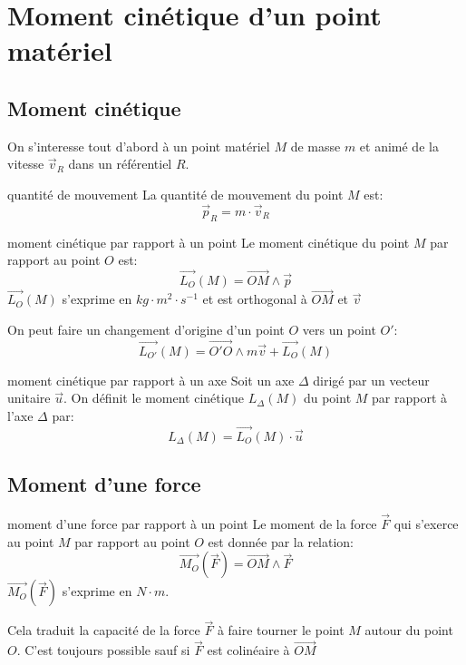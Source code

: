 \section{Moment cinétique d'un point matériel}
\subsection{Moment cinétique}

On s'interesse tout d'abord à un point matériel $M$ de masse $m$ 
et animé de la vitesse $\vec{v}_{R}$ dans un référentiel $R$. 
\newline
\begin{definition}{quantité de mouvement}{}
    La quantité de mouvement du point $M$ est: \[\vec{p}_{R} = m \cdot \vec{v}_{R}\]
\end{definition}

\begin{definition}{moment cinétique par rapport à un point}{}
    Le moment cinétique du point $M$ par rapport au point $O$ est:
    \[\vec{L_{O}}(M) = \vec{OM} \wedge \vec{p}\]
    $\vec{L_{O}}(M)$ s'exprime en $kg \cdot m^{2} \cdot s^{-1}$ 
    et est orthogonal à $\vec{OM}$ et $\vec{v}$
\end{definition}

\begin{remark}{}{}
    On peut faire un changement d'origine d'un point $O$ vers un point $O'$:
    \[\vec{L_{O'}}(M) = \vec{O'O} \wedge m\vec{v} + \vec{L_{O}}(M)\]
\end{remark}

\begin{definition}{moment cinétique par rapport à un axe}{}
    Soit un axe $\Delta$ dirigé par un vecteur unitaire $\vec{u}$.
    \newline
    On définit le moment cinétique $L_{\Delta}(M)$ du point $M$ par rapport à l'axe
    $\Delta$ par:
    \[L_{\Delta}(M) = \vec{L_{O}}(M) \cdot \vec{u}\]
\end{definition}


\subsection{Moment d'une force}

\begin{definition}{moment d'une force par rapport à un point}{}
    Le moment de la force $\vec{F}$ qui s'exerce au point $M$ 
    par rapport au point $O$ est donnée par la relation:
    \[\vec{M_{O}}(\vec{F}) = \vec{OM} \wedge \vec{F}\]
    $\vec{M_{O}}(\vec{F})$ s'exprime en $N \cdot m$. 

    Cela traduit la capacité de la force $\vec{F}$ à faire tourner
    le point $M$ autour du point $O$.
    C'est toujours possible sauf si $\vec{F}$ est colinéaire à $\vec{OM}$
\end{definition}

